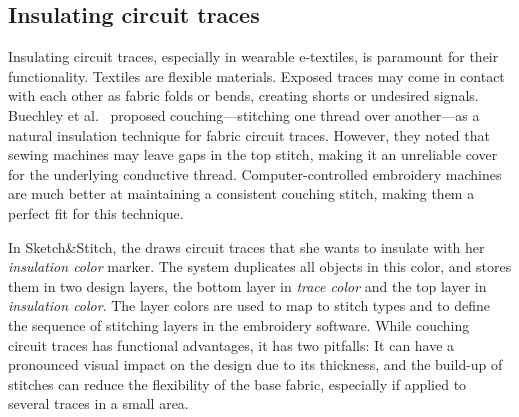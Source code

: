 \documentclass[header.tex]{subfiles}
\begin{document}
\subsection{Insulating circuit traces}
Insulating circuit traces, especially in wearable e-textiles, is paramount for their functionality. Textiles are flexible materials. Exposed traces may come in contact with each other as fabric folds or bends, creating shorts or undesired signals. Buechley et al.\ \cite{Buechley2009} proposed couching---stitching one thread over another---as a natural insulation technique for fabric circuit traces. However, they noted that sewing machines may leave gaps in the top stitch, making it an unreliable cover for the underlying conductive thread. Computer-controlled embroidery machines are much better at maintaining a consistent couching stitch, making them a perfect fit for this technique.


In Sketch\&Stitch, the draws circuit traces that she wants to insulate with her \textit{insulation color} marker. The system duplicates all objects in this color, and stores them in two design layers, the bottom layer in \textit{trace color} and the top layer in \textit{insulation color}. The layer colors are used to map to stitch types and to define the sequence of stitching layers in the embroidery software. 
While couching circuit traces has functional advantages, it has two pitfalls: It can have a pronounced visual impact on the design due to its thickness, and the build-up of stitches can reduce the flexibility of the base fabric, especially if applied to several traces in a small area.
\end{document}
